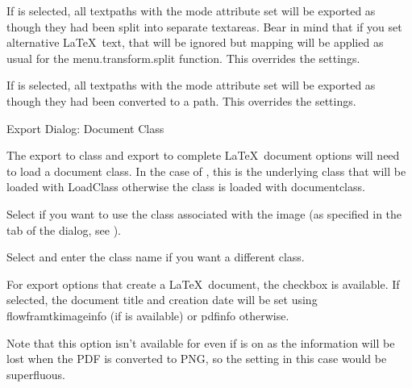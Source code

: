 
If  is selected, all
\glspl{textpath} with the  mode attribute set 
will be exported as though they had been split into separate
\glspl{textarea}. Bear in mind that if you set alternative
\LaTeX\ text, that will be ignored but mapping will be applied as
usual for the \gls{menu.transform.split} function.
This overrides the  settings.


If  is selected, all
\glspl{textpath} with the  mode attribute set 
will be exported as though they had been converted to a path.
This overrides the  settings.


 {}
 {Export Dialog: Document Class}

The export to class and export to complete \LaTeX\ document options will
need to load a document class.  In the case of ,
this is the underlying class that will be loaded with
\gls{LoadClass} otherwise the class is loaded with
\gls{documentclass}.


Select  if you want to use the
class associated with the image (as specified in the
 tab of the  dialog,
see ).


Select  and enter the class
name if you want a different class.


For export options that create a \LaTeX\ document, the
 checkbox is available. If selected, 
the document title and creation date will be set
using \gls{flowframtkimageinfo} (if  is
available) or \gls{pdfinfo} otherwise.

Note that this option isn't available for  even
if  is on as the information will be lost
when the PDF is converted to PNG, so the setting in this case would
be superfluous.

